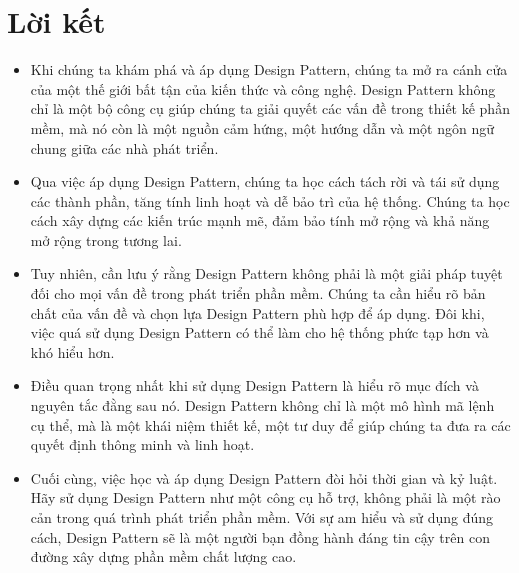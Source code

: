 \section{Lời kết}
\begin{itemize}
    \item Khi chúng ta khám phá và áp dụng Design Pattern, chúng ta mở ra cánh cửa của một thế giới bất tận của kiến thức và công nghệ. Design Pattern không chỉ là một bộ công cụ giúp chúng ta giải quyết các vấn đề trong thiết kế phần mềm, mà nó còn là một nguồn cảm hứng, một hướng dẫn và một ngôn ngữ chung giữa các nhà phát triển.
    \item Qua việc áp dụng Design Pattern, chúng ta học cách tách rời và tái sử dụng các thành phần, tăng tính linh hoạt và dễ bảo trì của hệ thống. Chúng ta học cách xây dựng các kiến trúc mạnh mẽ, đảm bảo tính mở rộng và khả năng mở rộng trong tương lai.
    \item Tuy nhiên, cần lưu ý rằng Design Pattern không phải là một giải pháp tuyệt đối cho mọi vấn đề trong phát triển phần mềm. Chúng ta cần hiểu rõ bản chất của vấn đề và chọn lựa Design Pattern phù hợp để áp dụng. Đôi khi, việc quá sử dụng Design Pattern có thể làm cho hệ thống phức tạp hơn và khó hiểu hơn.
    \item Điều quan trọng nhất khi sử dụng Design Pattern là hiểu rõ mục đích và nguyên tắc đằng sau nó. Design Pattern không chỉ là một mô hình mã lệnh cụ thể, mà là một khái niệm thiết kế, một tư duy để giúp chúng ta đưa ra các quyết định thông minh và linh hoạt.
    \item Cuối cùng, việc học và áp dụng Design Pattern đòi hỏi thời gian và kỷ luật. Hãy sử dụng Design Pattern như một công cụ hỗ trợ, không phải là một rào cản trong quá trình phát triển phần mềm. Với sự am hiểu và sử dụng đúng cách, Design Pattern sẽ là một người bạn đồng hành đáng tin cậy trên con đường xây dựng phần mềm chất lượng cao.
\end{itemize}